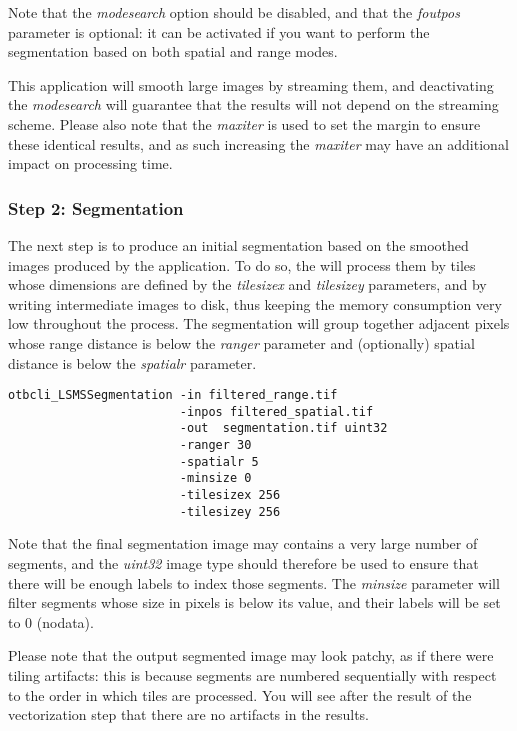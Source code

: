 Note that the \emph{modesearch} option should be disabled, and
that the \emph{foutpos} parameter is optional: it can be activated
if you want to perform the segmentation based on both spatial and
range modes.

This application will smooth large images by streaming them, and
deactivating the \emph{modesearch} will guarantee that the results
will not depend on the streaming scheme. Please also note that the
\emph{maxiter} is used to set the margin to ensure these
identical results, and as such increasing the \emph{maxiter} may
have an additional impact on processing time.

\subsubsection{Step 2: Segmentation}

The next step is to produce an initial segmentation based on the
smoothed images produced by the 
application. To do so, the  will process
them by tiles whose dimensions are defined by the
\emph{tilesizex} and \emph{tilesizey} parameters, and by
writing intermediate images to disk, thus keeping the memory
consumption very low throughout the process. The segmentation will
group together adjacent pixels whose range distance is below the
\emph{ranger} parameter and (optionally) spatial distance is
below the \emph{spatialr} parameter.

\begin{verbatim}
otbcli_LSMSSegmentation -in filtered_range.tif
                        -inpos filtered_spatial.tif
                        -out  segmentation.tif uint32 
                        -ranger 30 
                        -spatialr 5 
                        -minsize 0 
                        -tilesizex 256 
                        -tilesizey 256
\end{verbatim}

Note that the final segmentation image may contains a very large
number of segments, and the \emph{uint32} image type should
therefore be used to ensure that there will be enough labels to index
those segments. The \emph{minsize} parameter will filter segments
whose size in pixels is below its value, and their labels will be set
to 0 (nodata). 

Please note that the output segmented image may look patchy, as if
there were tiling artifacts: this is because segments are numbered
sequentially with respect to the order in which tiles are
processed. You will see after the result of the vectorization step
that there are no artifacts in the results.

